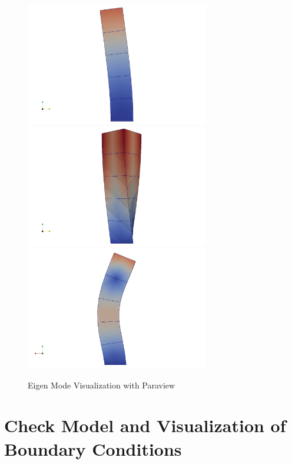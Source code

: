 \begin{figure}[H]
  \centering
  \includegraphics[width = 8cm]{./Figure-files/Day1/Postprocess_examples_with_Paraview/eigenmode1.jpg}
  \includegraphics[width = 8cm]{./Figure-files/Day1/Postprocess_examples_with_Paraview/eigenmode2.jpg}
  \includegraphics[width = 8cm]{./Figure-files/Day1/Postprocess_examples_with_Paraview/eigenmode3.jpg}
  \caption{Eigen Mode Visualization with Paraview}
  \label{fig_paraview_eigen}
\end{figure}


\clearpage
\newpage
\section{Check Model and Visualization of Boundary Conditions}
\label{Check_Model_and_Visualization_of_Boundary_Conditions}

